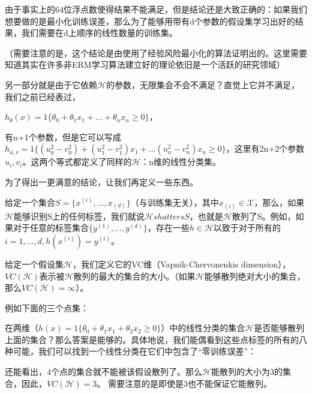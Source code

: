 \documentclass[UTF8]{ctexart}
\begin{document}
由于事实上的64位浮点数使得结果不能满足，但是结论还是大致正确的：如果我们想要做的是最小化训练误差，那么为了能够用带有d个参数的假设集学习出好的结果，我们需要在d上顺序的线性数量的训练集。

（需要注意的是，这个结论是由使用了经验风险最小化的算法证明出的。这里需要知道其实在许多非ERM学习算法建立好的理论依旧是一个活跃的研究领域）

另一部分就是由于它依赖$\mathcal{H}$的参数，无限集会不会不满足？直觉上它并不满足，我们之前已经表过，

$h_{\theta}(x)=1 \{ \theta_{0}+\theta_{1} x_{1}+...+\theta_{n} x_{n} \geq 0 \}$，






有n+1个参数，但是它可以写成$h_{u,v}=1\{ (u_{0}^{2} -v_{0}^{2})+(u_{1}^{2} -v_{1}^{2})x_{1} + ...(u_{n}^{2} -v_{n}^{2})x_{n} \geq 0 \}$，这里有2n+2个参数$u_{i},v_{i}$。这两个等式都定义了同样的$\mathcal{H}$：n维的线性分类集。

为了得出一更满意的结论，让我们再定义一些东西。

给定一个集合$S=\{x^{(i)},...,x_{(d)}  \}$（与训练集无关），其中$x_{(i)}\in \mathcal{X}$，那么，如果$\mathcal{H}$能够识别S上的任何标签，我们就说$\mathcal{H} shatters S$，也就是$\mathcal{H}$散列了S。例如，如果对于任意的标签集合$\{y^{(1)},...,y^{(d)}\}$，存在一些$h\in \mathcal{H}$以致于对于所有的$i=1,...,d,h(x^{(i)})=y^{(i)}$。

给定一个假设集$\mathcal{H}$，我们定义它的VC维（Vapnik-Chervonenkis dimension），$VC(\mathcal{H})$表示被$\mathcal{H}$散列的最大的集合的大小。（如果$\mathcal{H}$能够散列绝对大小的集合，那么$VC(\mathcal{H})=\infty$）。

例如下面的三个点集：

\begin{figure}[htb]        
\end{figure}
 
在两维（$h(x)=1\{\theta_{0}+ \theta_{1}x_{1}  + \theta_{2}x_{2} \geq 0 \}$）中的线性分类的集合$\mathcal{H}$是否能够散列上面的集合？那么答案是能够的。具体地说，我们能偶看到这些点标签的所有的八种可能，我们可以找到一个线性分类在它们中包含了“零训练误差”：


\begin{figure}[htb]        
\end{figure}


还能看出，4个点的集合就不能被该假设散列了。那么$\mathcal{H}$能散列的大小为3的集合，因此，$VC(\mathcal{H})=3$。
需要注意的是即使是3也不能保证它能散列。
\end{document}
